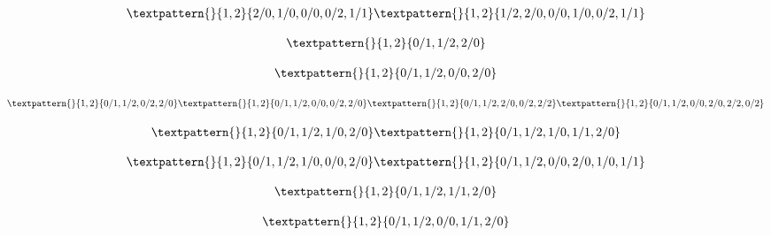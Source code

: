 \begin{equation}
	\begin{gathered}
		\textpattern{}{1,2}{2/0,1/0,0/0,0/2,1/1}
		\textpattern{}{1,2}{1/2,2/0,0/0,1/0,0/2,1/1}
	\end{gathered}
	\label{cls:23}
\end{equation}

\begin{equation}
	\begin{gathered}
		\textpattern{}{1,2}{0/1,1/2,2/0}
	\end{gathered}
	\label{cls:24}
\end{equation}

\begin{equation}
	\begin{gathered}
		\textpattern{}{1,2}{0/1,1/2,0/0,2/0}
	\end{gathered}
	\label{cls:25}
\end{equation}

\begin{equation}
	\begin{gathered}
		\textpattern{}{1,2}{0/1,1/2,0/2,2/0}
		\textpattern{}{1,2}{0/1,1/2,0/0,0/2,2/0}
		\textpattern{}{1,2}{0/1,1/2,2/0,0/2,2/2}
		\textpattern{}{1,2}{0/1,1/2,0/0,2/0,2/2,0/2}
	\end{gathered}
	\label{cls:26}
\end{equation}

\begin{equation}
	\begin{gathered}
		\textpattern{}{1,2}{0/1,1/2,1/0,2/0}
		\textpattern{}{1,2}{0/1,1/2,1/0,1/1,2/0}
	\end{gathered}
	\label{cls:27}
\end{equation}

\begin{equation}
	\begin{gathered}
		\textpattern{}{1,2}{0/1,1/2,1/0,0/0,2/0}
		\textpattern{}{1,2}{0/1,1/2,0/0,2/0,1/0,1/1}
	\end{gathered}
	\label{cls:28}
\end{equation}

\begin{equation}
	\begin{gathered}
		\textpattern{}{1,2}{0/1,1/2,1/1,2/0}
	\end{gathered}
	\label{cls:29}
\end{equation}

\begin{equation}
	\begin{gathered}
		\textpattern{}{1,2}{0/1,1/2,0/0,1/1,2/0}
	\end{gathered}
	\label{cls:30}
\end{equation}

